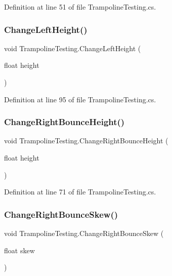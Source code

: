 Definition at line 51 of file Trampoline\+Testing.\+cs.

\mbox{\label{class_trampoline_testing_a78b898a3ef7dff4789b7fc178115e90b}} 
\subsubsection{\texorpdfstring{Change\+Left\+Height()}{ChangeLeftHeight()}}
{\footnotesize\ttfamily void Trampoline\+Testing.\+Change\+Left\+Height (\begin{DoxyParamCaption}\item[{float}]{height }\end{DoxyParamCaption})}



Definition at line 95 of file Trampoline\+Testing.\+cs.

\mbox{\label{class_trampoline_testing_abd2ed08a76b386d9cdb0e8e3bddf9803}} 
\subsubsection{\texorpdfstring{Change\+Right\+Bounce\+Height()}{ChangeRightBounceHeight()}}
{\footnotesize\ttfamily void Trampoline\+Testing.\+Change\+Right\+Bounce\+Height (\begin{DoxyParamCaption}\item[{float}]{height }\end{DoxyParamCaption})}



Definition at line 71 of file Trampoline\+Testing.\+cs.

\mbox{\label{class_trampoline_testing_acd918a942955538955286aebec463e5c}} 
\subsubsection{\texorpdfstring{Change\+Right\+Bounce\+Skew()}{ChangeRightBounceSkew()}}
{\footnotesize\ttfamily void Trampoline\+Testing.\+Change\+Right\+Bounce\+Skew (\begin{DoxyParamCaption}\item[{float}]{skew }\end{DoxyParamCaption})}



